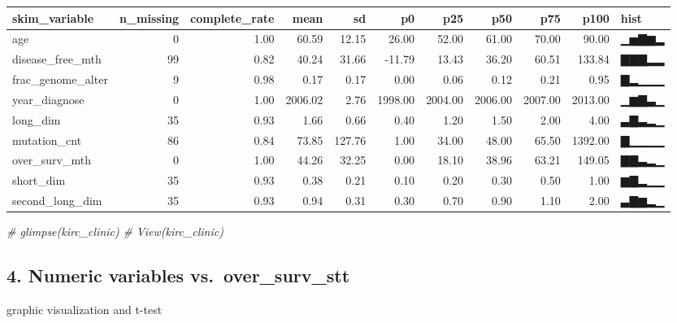 \documentclass[]{article}
\newenvironment{Shaded}{\begin{snugshade}}{\end{snugshade}}
\newcommand{\CommentTok}[1]{\textcolor[rgb]{0.56,0.35,0.01}{\textit{#1}}}
\begin{document}
\begin{longtable}[]{@{}lrrrrrrrrrl@{}}
\toprule
skim\_variable & n\_missing & complete\_rate & mean & sd & p0 & p25 &
p50 & p75 & p100 & hist\tabularnewline
\midrule
\endhead
age & 0 & 1.00 & 60.59 & 12.15 & 26.00 & 52.00 & 61.00 & 70.00 & 90.00 &
▁▅▇▆▂\tabularnewline
disease\_free\_mth & 99 & 0.82 & 40.24 & 31.66 & -11.79 & 13.43 & 36.20
& 60.51 & 133.84 & ▇▇▇▂▂\tabularnewline
frac\_genome\_alter & 9 & 0.98 & 0.17 & 0.17 & 0.00 & 0.06 & 0.12 & 0.21
& 0.95 & ▇▂▁▁▁\tabularnewline
year\_diagnose & 0 & 1.00 & 2006.02 & 2.76 & 1998.00 & 2004.00 & 2006.00
& 2007.00 & 2013.00 & ▁▆▇▃▁\tabularnewline
long\_dim & 35 & 0.93 & 1.66 & 0.66 & 0.40 & 1.20 & 1.50 & 2.00 & 4.00 &
▃▇▃▂▁\tabularnewline
mutation\_cnt & 86 & 0.84 & 73.85 & 127.76 & 1.00 & 34.00 & 48.00 &
65.50 & 1392.00 & ▇▁▁▁▁\tabularnewline
over\_surv\_mth & 0 & 1.00 & 44.26 & 32.25 & 0.00 & 18.10 & 38.96 &
63.21 & 149.05 & ▇▇▃▂▁\tabularnewline
short\_dim & 35 & 0.93 & 0.38 & 0.21 & 0.10 & 0.20 & 0.30 & 0.50 & 1.00
& ▆▇▂▁▁\tabularnewline
second\_long\_dim & 35 & 0.93 & 0.94 & 0.31 & 0.30 & 0.70 & 0.90 & 1.10
& 2.00 & ▃▇▆▂▁\tabularnewline
\bottomrule
\end{longtable}

\begin{Shaded}
\begin{Highlighting}[]
\CommentTok{# glimpse(kirc_clinic)}
\CommentTok{# View(kirc_clinic)}
\end{Highlighting}
\end{Shaded}

\subsection{4. Numeric variables
vs.~over\_surv\_stt}\label{numeric-variables-vs.over_surv_stt}

graphic visualization and t-test
\end{document}

